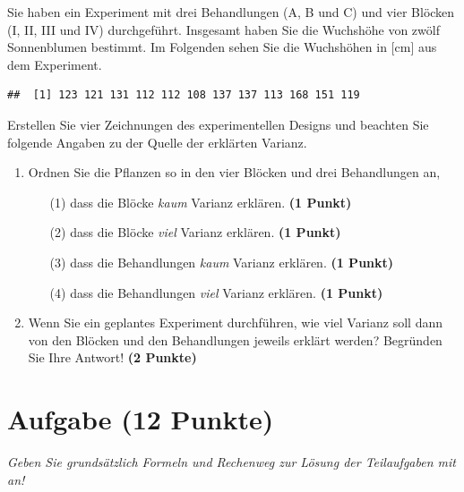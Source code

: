 \documentclass[a4paper, 10pt]{scrartcl}\usepackage[]{graphicx}\usepackage[]{xcolor}
\makeatletter
\newenvironment{kframe}{%
 \def\at@end@of@kframe{}%
 \ifinner\ifhmode%
  \def\at@end@of@kframe{\end{minipage}}%
  \begin{minipage}{\columnwidth}%
 \fi\fi%
 \def\FrameCommand##1{\hskip\@totalleftmargin \hskip-\fboxsep
 \colorbox{shadecolor}{##1}\hskip-\fboxsep
     \hskip-\linewidth \hskip-\@totalleftmargin \hskip\columnwidth}%
 \MakeFramed {\advance\hsize-\width
   \@totalleftmargin\z@ \linewidth\hsize
   \@setminipage}}%
 {\par\unskip\endMakeFramed%
 \at@end@of@kframe}
\newenvironment{knitrout}{}{} %
\makeatother
\begin{document}
Sie haben ein Experiment mit drei Behandlungen (A, B und C) und vier
Bl{\"o}cken (I, II, III und IV) durchgef{\"u}hrt. Insgesamt haben Sie die Wuchsh{\"o}he
von zw{\"o}lf Sonnenblumen bestimmt. Im Folgenden sehen Sie die Wuchsh{\"o}hen in
[cm] aus dem Experiment.


\begin{knitrout}
\color{fgcolor}\begin{kframe}
\begin{verbatim}
##  [1] 123 121 131 112 112 108 137 137 113 168 151 119
\end{verbatim}
\end{kframe}
\end{knitrout}

Erstellen Sie vier Zeichnungen des experimentellen Designs und beachten
Sie folgende Angaben zu der Quelle der erkl{\"a}rten Varianz. 

\begin{enumerate}
\item Ordnen Sie die Pflanzen so in den vier Bl{\"o}cken und drei Behandlungen an,
  \begin{enumerate}
  \item[(1)] dass die Bl{\"o}cke \textit{kaum} Varianz erkl{\"a}ren. \textbf{(1 Punkt)}
  \item[(2)] dass die Bl{\"o}cke \textit{viel} Varianz erkl{\"a}ren. \textbf{(1 Punkt)}  
  \item[(3)] dass die Behandlungen \textit{kaum} Varianz erkl{\"a}ren. \textbf{(1 Punkt)}
  \item[(4)] dass die Behandlungen \textit{viel} Varianz erkl{\"a}ren. \textbf{(1 Punkt)}
  \end{enumerate}
\item Wenn Sie ein geplantes Experiment durchf{\"u}hren, wie viel Varianz soll dann von
  den Bl{\"o}cken und den Behandlungen jeweils erkl{\"a}rt werden? Begr{\"u}nden Sie
  Ihre Antwort! \textbf{(2 Punkte)}
\end{enumerate}
 
\clearpage

\section{Aufgabe \hfill (12 Punkte)}

\textit{Geben Sie grunds{\"a}tzlich Formeln und Rechenweg zur L{\"o}sung der
  Teilaufgaben mit an!} \\[1Ex]
\end{document}
